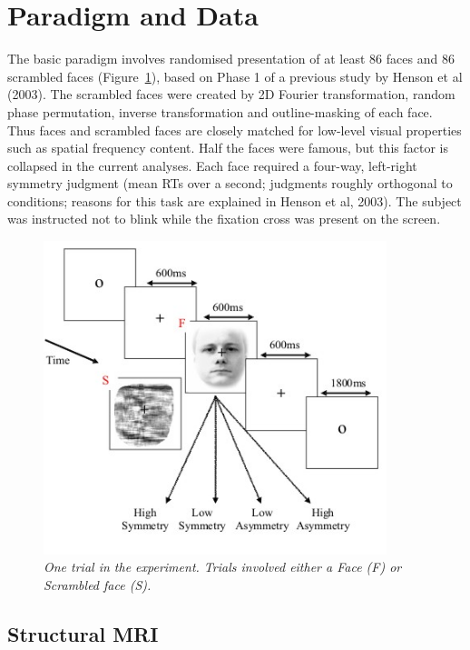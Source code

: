 \section{Paradigm and Data}

The basic paradigm involves randomised presentation of at least 86 faces and 86 scrambled faces (Figure~\ref{multimodal:fig:1}), based on Phase 1 of a previous study by Henson et al (2003). The scrambled faces were created by 2D Fourier transformation, random phase permutation, inverse transformation and outline-masking of each face. Thus faces and scrambled faces are closely matched for low-level visual properties such as spatial frequency content. Half the faces were famous, but this factor is collapsed in the current analyses. Each face required a four-way, left-right symmetry judgment (mean RTs over a second; judgments roughly orthogonal to conditions; reasons for this task are explained in Henson et al, 2003). The subject was instructed not to blink while the fixation cross was present on the screen.

\begin{figure}
\begin{center}
\includegraphics[width=100mm]{multimodal/figures/paradigm}
\caption{\em One trial in the experiment. Trials involved either a Face (F) or Scrambled face (S). \label{multimodal:fig:1}}
\end{center}
\end{figure}

\subsection{Structural MRI}

